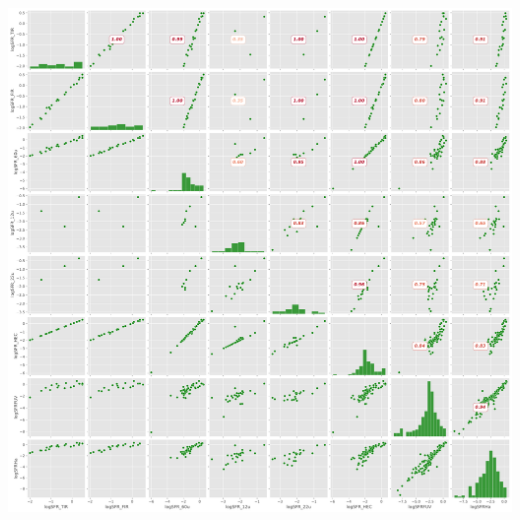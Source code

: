 \documentclass[
]{article}
\begin{document}
\includegraphics{compare_files/figure-pdf/cell-38-output-1.pdf}
\end{document}
